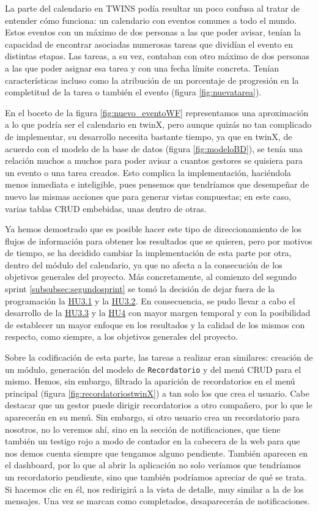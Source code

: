 La parte del calendario en TWINS podía resultar un poco confusa al tratar de entender cómo funciona: un calendario con eventos comunes a todo el mundo. Estos eventos con un máximo de dos personas a las que poder avisar, tenían la capacidad de encontrar asociadas numerosas tareas que dividían el evento en distintas etapas. Las tareas, a su vez, contaban con otro máximo de dos personas a las que poder asignar esa tarea y con una fecha límite concreta. Tenían características incluso como la atribución de un porcentaje de progresión en la completitud de la tarea o también el evento (figura \ref{fig:nuevatarea}).

En el boceto de la figura \ref{fig:nuevo_eventoWF} representamos una aproximación a lo que podría ser el calendario en twinX, pero aunque quizás no tan complicado de implementar, su desarrollo necesita bastante tiempo, ya que en twinX, de acuerdo con el modelo de la base de datos (figura \ref{fig:modeloBD}), se tenía una relación muchos a muchos para poder avisar a cuantos gestores se quisiera para un evento o una tarea creados. Esto complica la implementación, haciéndola menos inmediata e inteligible, pues pensemos que tendríamos que desempeñar de nuevo las mismas acciones que para generar vistas compuestas; en este caso, varias tablas CRUD embebidas, unas dentro de otras.

Ya hemos demostrado que es posible hacer este tipo de direccionamiento de los flujos de información para obtener los resultados que se quieren, pero por motivos de tiempo, se ha decidido cambiar la implementación de esta parte por otra, dentro del módulo del calendario, ya que no afecta a la consecución de los objetivos generales del proyecto. Más concretamente, al comienzo del segundo sprint \ref{subsubsec:segundosprint} se tomó la decisión de dejar fuera de la programación la \hyperref[tab:HU3.1]{HU3.1} y la \hyperref[tab:HU3.2]{HU3.2}. En consecuencia, se pudo llevar a cabo el desarrollo de la \hyperref[tab:HU3.3]{HU3.3} y la \hyperref[tab:HU4]{HU4} con mayor margen temporal y con la posibilidad de establecer un mayor enfoque en los resultados y la calidad de los mismos con respecto, como siempre, a los objetivos generales del proyecto.

Sobre la codificación de esta parte, las tareas a realizar eran similares: creación de un módulo, generación del modelo de \texttt{Recordatorio} y del menú CRUD para el mismo. Hemos, sin embargo, filtrado la aparición de recordatorios en el menú principal (figura \ref{fig:recordatoriostwinX}) a tan solo los que crea el usuario. Cabe destacar que un gestor puede dirigir recordatorios a otro compañero, por lo que le aparecerán en su menú. Sin embargo, si otro usuario crea un recordatorio para nosotros, no lo veremos ahí, sino en la sección de notificaciones, que tiene también un testigo rojo a modo de contador en la cabecera de la web para que nos demos cuenta siempre que tengamos alguno pendiente. También aparecen en el dashboard, por lo que al abrir la aplicación no solo veríamos que tendríamos un recordatorio pendiente, sino que también podríamos apreciar de qué se trata. Si hacemos clic en él, nos redirigirá a la vista de detalle, muy similar a la de los mensajes. Una vez se marcan como completados, desaparecerán de notificaciones.

